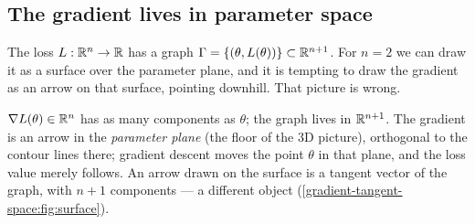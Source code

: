 \begin{notechapter}
\section{The gradient lives in parameter space}\label{gradient-tangent-space:sec:graph}

The loss $L:\mathbb{R}^n\to\mathbb{R}$ has a graph $\Gamma = \{(\theta, L(\theta))\}\subset\mathbb{R}^{n+1}$. For $n = 2$ we can draw it as a
surface over the parameter plane, and it is tempting to draw the gradient as an arrow on that
surface, pointing downhill. That picture is wrong.

\begin{pitfall}
$\nabla L(\theta)\in\mathbb{R}^n$ has as many components as $\theta$; the graph lives in $\mathbb{R}^{n+1}$. The gradient is an
arrow in the \emph{parameter plane} (the floor of the 3D picture), orthogonal to the contour lines
there; gradient descent moves the point $\theta$ in that plane, and the loss value merely
follows. An arrow drawn on the surface is a tangent vector of the graph, with $n+1$ components ---
a different object (\cref{gradient-tangent-space:fig:surface}).
\end{pitfall}


\end{notechapter}
